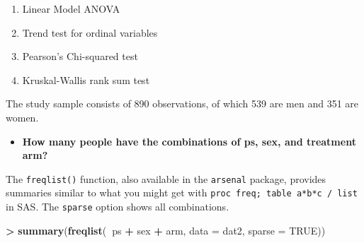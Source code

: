 \documentclass[
]{book}
\newenvironment{Shaded}{\begin{snugshade}}{\end{snugshade}}
\newcommand{\CommentTok}[1]{\textcolor[rgb]{0.56,0.35,0.01}{\textit{#1}}}
\newcommand{\DataTypeTok}[1]{\textcolor[rgb]{0.13,0.29,0.53}{#1}}
\newcommand{\ErrorTok}[1]{\textcolor[rgb]{0.64,0.00,0.00}{\textbf{#1}}}
\newcommand{\KeywordTok}[1]{\textcolor[rgb]{0.13,0.29,0.53}{\textbf{#1}}}
\newcommand{\NormalTok}[1]{#1}
\newcommand{\OperatorTok}[1]{\textcolor[rgb]{0.81,0.36,0.00}{\textbf{#1}}}
\newcommand{\OtherTok}[1]{\textcolor[rgb]{0.56,0.35,0.01}{#1}}
\newcommand{\StringTok}[1]{\textcolor[rgb]{0.31,0.60,0.02}{#1}}
\providecommand{\tightlist}{%
  \setlength{\itemsep}{0pt}\setlength{\parskip}{0pt}}
\begin{document}
\begin{enumerate}
\def\labelenumi{\arabic{enumi}.}
\tightlist
\item
  Linear Model ANOVA
\item
  Trend test for ordinal variables
\item
  Pearson's Chi-squared test
\item
  Kruskal-Wallis rank sum test
\end{enumerate}

\begin{Shaded}
\end{Shaded}

The study sample consists of 890 observations, of which 539 are men and 351 are women.

\begin{itemize}
\tightlist
\item
  \textbf{How many people have the combinations of ps, sex, and treatment arm?}
\end{itemize}

The \texttt{freqlist()} function, also available in the \texttt{arsenal} package, provides summaries similar to what you might get with \texttt{proc\ freq;\ table\ a*b*c\ /\ list} in SAS. The \texttt{sparse} option shows all combinations.

\begin{Shaded}
\begin{Highlighting}[]
\OperatorTok{>}\StringTok{ }\KeywordTok{summary}\NormalTok{(}\KeywordTok{freqlist}\NormalTok{(}\OperatorTok{~}\NormalTok{ps }\OperatorTok{+}\StringTok{ }\NormalTok{sex }\OperatorTok{+}\StringTok{ }\NormalTok{arm, }\DataTypeTok{data =}\NormalTok{ dat2, }\DataTypeTok{sparse =} \OtherTok{TRUE}\NormalTok{))}
\end{Highlighting}
\end{Shaded}
\end{document}
